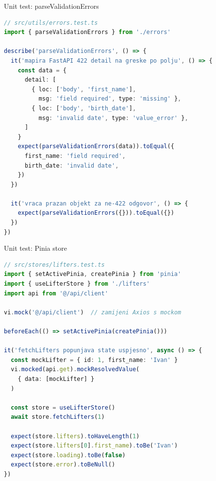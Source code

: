 \begin{frame}[fragile,shrink=5]{Unit test: parseValidationErrors}
\begin{lstlisting}[language=typescript]
// src/utils/errors.test.ts
import { parseValidationErrors } from './errors'

describe('parseValidationErrors', () => {
  it('mapira FastAPI 422 detail na greske po polju', () => {
    const data = {
      detail: [
        { loc: ['body', 'first_name'],
          msg: 'field required', type: 'missing' },
        { loc: ['body', 'birth_date'],
          msg: 'invalid date', type: 'value_error' },
      ]
    }
    expect(parseValidationErrors(data)).toEqual({
      first_name: 'field required',
      birth_date: 'invalid date',
    })
  })

  it('vraca prazan objekt za ne-422 odgovor', () => {
    expect(parseValidationErrors({})).toEqual({})
  })
})
\end{lstlisting}
\end{frame}

\begin{frame}[fragile,shrink=5]{Unit test: Pinia store}
\begin{lstlisting}[language=typescript]
// src/stores/lifters.test.ts
import { setActivePinia, createPinia } from 'pinia'
import { useLifterStore } from './lifters'
import api from '@/api/client'

vi.mock('@/api/client')  // zamijeni Axios s mockom

beforeEach(() => setActivePinia(createPinia()))

it('fetchLifters popunjava state uspjesno', async () => {
  const mockLifter = { id: 1, first_name: 'Ivan' }
  vi.mocked(api.get).mockResolvedValue(
    { data: [mockLifter] }
  )

  const store = useLifterStore()
  await store.fetchLifters(1)

  expect(store.lifters).toHaveLength(1)
  expect(store.lifters[0].first_name).toBe('Ivan')
  expect(store.loading).toBe(false)
  expect(store.error).toBeNull()
})
\end{lstlisting}
\end{frame}

